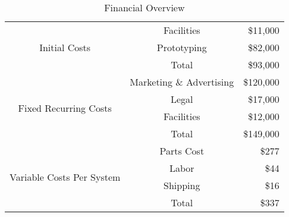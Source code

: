 \begin{table}
\caption{Financial Overview}
\begin{tabular}{|c|c|r|}\hline
\multirow{3}{*}{Initial Costs} & Facilities  & \$11,000\\\cline{2-3}
                               & Prototyping & \$82,000\\\cline{2-3}
                               & Total       & \$93,000\\\hline\hline
\multirow{4}{*}{Fixed Recurring Costs} & Marketing \& Advertising & \$120,000\\\cline{2-3}
                                       & Legal & \$17,000\\\cline{2-3}
                                       & Facilities & \$12,000\\\cline{2-3}
                                       & Total & \$149,000\\\hline\hline

\multirow{4}{*}{Variable Costs Per System} & Parts Cost & \$277\\\cline{2-3}
                                           & Labor      & \$44\\\cline{2-3}
                                           & Shipping   & \$16\\\cline{2-3}
                                           & Total      & \$337\\\hline\hline
\end{tabular}
\label{tab:final_numers}
\end{table}
